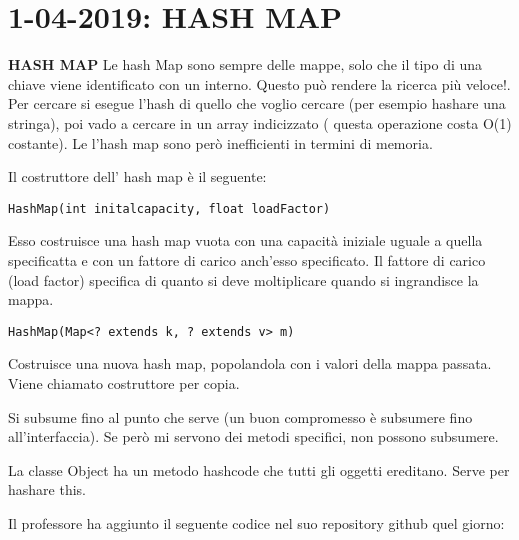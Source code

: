 

\newpage
\section{1-04-2019: HASH MAP}
\textbf{HASH MAP} \newline
Le hash Map sono sempre delle mappe, solo che il tipo di una chiave viene identificato con un interno. Questo può rendere la ricerca più veloce!. \newline
Per cercare si esegue l'hash di quello che voglio cercare (per esempio hashare una stringa), poi vado a cercare in un array indicizzato ( questa operazione costa O(1) costante). \newline
Le l'hash map sono però inefficienti in termini di memoria. 

\noindent Il costruttore dell' hash map è il seguente: 
\begin{lstlisting}[basicstyle=\small,]
	HashMap(int initalcapacity, float loadFactor)
\end{lstlisting}
Esso costruisce una hash map vuota con una capacità iniziale uguale a quella specificatta e con un fattore di carico anch'esso specificato. Il fattore di carico (load factor) specifica di quanto si deve moltiplicare quando si ingrandisce la mappa. 
\begin{lstlisting}[basicstyle=\small,]
	HashMap(Map<? extends k, ? extends v> m)
\end{lstlisting}
Costruisce una nuova hash map, popolandola con i valori della mappa passata. Viene chiamato costruttore per copia.

\noindent Si subsume fino al punto che serve (un buon compromesso è subsumere fino all'interfaccia). Se però mi servono dei metodi specifici, non possono subsumere. 

\noindent La classe Object ha un metodo hashcode che tutti gli oggetti ereditano. Serve per hashare this.



\noindent Il professore ha aggiunto il seguente codice nel suo repository github quel giorno: 

